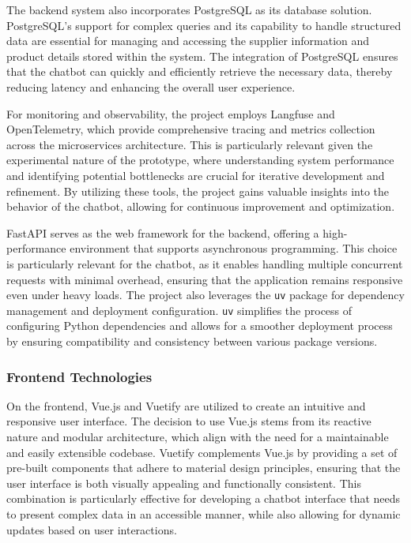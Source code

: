 
The backend system also incorporates PostgreSQL as its database solution.
PostgreSQL’s support for complex queries and
its capability to handle structured data are essential for managing and accessing the supplier information and product
details stored within the system.
The integration of PostgreSQL ensures that the chatbot can quickly and efficiently
retrieve the necessary data, thereby reducing latency and enhancing the overall user experience.


For monitoring and observability, the project employs Langfuse and OpenTelemetry, which provide comprehensive tracing
and metrics collection across the microservices architecture.
This is particularly relevant given the experimental
nature of the prototype, where understanding system performance and identifying potential bottlenecks are crucial for
iterative development and refinement.
By utilizing these tools, the project gains valuable insights into the behavior of
the chatbot, allowing for continuous improvement and optimization.


FastAPI serves as the web framework for the backend, offering a high-performance environment that supports asynchronous
programming.
This choice is particularly relevant for the chatbot, as it enables handling multiple concurrent requests
with minimal overhead, ensuring that the application remains responsive even under heavy loads.
The project also
leverages the \texttt{uv} package for dependency management and deployment configuration. \texttt{uv}
simplifies the process of configuring Python dependencies and allows for a smoother deployment process by ensuring
compatibility and consistency between various package versions.

\subsubsection{Frontend Technologies}

On the frontend, Vue.js and Vuetify are utilized to create an intuitive and responsive user interface.
The decision to
use Vue.js stems from its reactive nature and modular architecture, which align with the need for a maintainable and
easily extensible codebase.
Vuetify complements Vue.js by providing a set of pre-built components that adhere to
material design principles, ensuring that the user interface is both visually appealing and functionally consistent.
This combination is particularly effective for developing a chatbot interface that needs to present complex data in an
accessible manner, while also allowing for dynamic updates based on user interactions.

